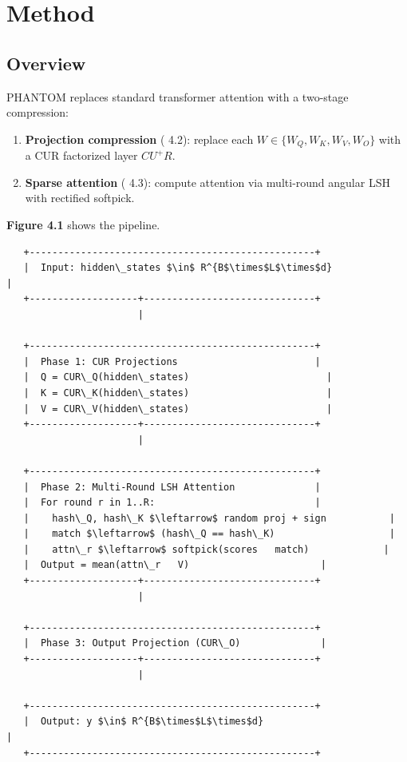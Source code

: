
\section{Method}

\subsection{Overview}

PHANTOM replaces standard transformer attention with a two-stage compression:

\begin{enumerate}
\item \textbf{Projection compression} ( 4.2): replace each $W \in \{W_Q, W_K, W_V, W_O\}$
  with a CUR factorized layer $C U^+ R$.
\item \textbf{Sparse attention} ( 4.3): compute attention via multi-round angular LSH
  with rectified softpick.

\end{enumerate}
\textbf{Figure 4.1} shows the pipeline.

\begin{lstlisting}
   +--------------------------------------------------+
   |  Input: hidden\_states $\in$ R^{B$\times$L$\times$d}                |
   +-------------------+------------------------------+
                       |
                        
   +--------------------------------------------------+
   |  Phase 1: CUR Projections                        |
   |  Q = CUR\_Q(hidden\_states)                        |
   |  K = CUR\_K(hidden\_states)                        |
   |  V = CUR\_V(hidden\_states)                        |
   +-------------------+------------------------------+
                       |
                        
   +--------------------------------------------------+
   |  Phase 2: Multi-Round LSH Attention              |
   |  For round r in 1..R:                            |
   |    hash\_Q, hash\_K $\leftarrow$ random proj + sign           |
   |    match $\leftarrow$ (hash\_Q == hash\_K)                    |
   |    attn\_r $\leftarrow$ softpick(scores   match)             |
   |  Output = mean(attn\_r   V)                       |
   +-------------------+------------------------------+
                       |
                        
   +--------------------------------------------------+
   |  Phase 3: Output Projection (CUR\_O)              |
   +-------------------+------------------------------+
                       |
                        
   +--------------------------------------------------+
   |  Output: y $\in$ R^{B$\times$L$\times$d}                           |
   +--------------------------------------------------+
\end{lstlisting}

